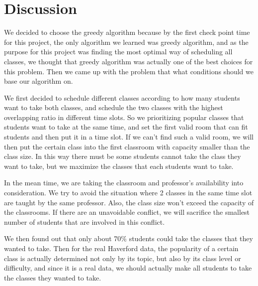 \documentclass[11pt, oneside]{article}   	%
\begin{document}


\newpage
\section{Discussion}

We decided to choose the greedy algorithm because by the first check point time for this project, the only algorithm we learned was greedy algorithm, and as the purpose for this project was finding the most optimal way of scheduling all classes, we thought that greedy algorithm was actually one of the best choices for this problem. Then we came up with the problem that what conditions should we base our algorithm on.

We first decided to schedule different classes according to how many students want to take both classes, and schedule the two classes with the highest overlapping ratio in different time slots. So we prioritizing popular classes that students want to take at the same time, and set the first valid room that can fit students and then put it in a time slot. If we can't find such a valid room, we will then put the certain class into the first classroom with capacity smaller than the class size. In this way there must be some students cannot take the class they want to take, but we maximize the classes that each students want to take.

In the mean time, we are taking the classroom and professor's availability into consideration. We try to avoid the situation where 2 classes in the same time slot are taught by the same professor. Also, the class size won't exceed the capacity of the classrooms. If there are an unavoidable conflict, we will sacrifice the smallest number of students that are involved in this conflict.

We then found out that only about 70\% students could take the classes that they wanted to take. Then for the real Haverford data, the popularity of a certain class is actually determined not only by its topic, but also by its class level or difficulty, and since it is a real data, we should actually make all students to take the classes they wanted to take. 
\end{document}
